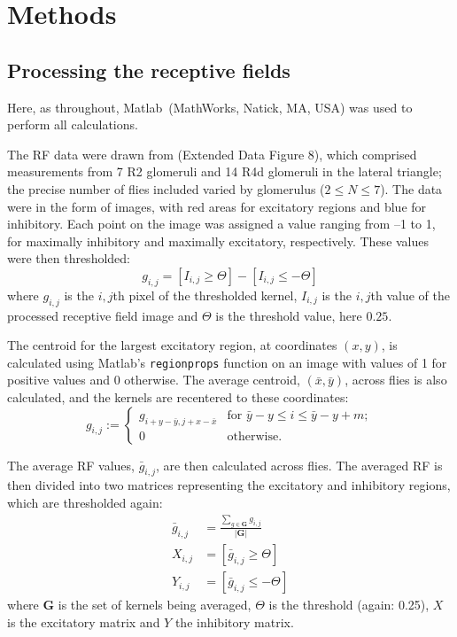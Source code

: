 

\section{Methods}
\subsection{Processing the receptive fields}
\label{sec:methods:preprocessing}

Here, as throughout, Matlab\textregistered\ (MathWorks, Natick, MA, USA) was used to perform all calculations.

The \ac{RF} data were drawn from  (Extended Data Figure 8), which comprised measurements from 7 R2 glomeruli and 14 R4d glomeruli in the lateral triangle; the precise number of flies included varied by glomerulus ($2\le N\le 7$).
The data were in the form of images, with red areas for excitatory regions and blue for inhibitory.
Each point on the image was assigned a value ranging from --1 to 1, for maximally inhibitory and maximally excitatory, respectively.
These values were then thresholded:
$$
g_{i,j} = [I_{i,j} \ge \Theta] - [I_{i,j} \le -\Theta]
$$
where $g_{i,j}$ is the $i,j$th pixel of the thresholded kernel, $I_{i,j}$ is the $i,j$th value of the processed receptive field image and $\Theta$ is the threshold value, here $0.25$.

The centroid for the largest excitatory region, at coordinates $(x,y)$, is calculated using Matlab's \texttt{regionprops} function on an image with values of 1 for positive values and 0 otherwise.
The average centroid, $(\bar{x},\bar{y})$, across flies is also calculated, and the kernels are recentered to these coordinates:
$$
g_{i,j} := \left\{ \begin{array}{ll} g_{i+y-\bar{y},j+x-\bar{x}} & \mbox{for } \bar{y}-y \le i \le \bar{y}-y+m ;\\
0 & \mbox{otherwise.} \end{array} \right.
$$

The average \ac{RF} values, $\bar{g}_{i,j}$, are then calculated across flies.
The averaged \ac{RF} is then divided into two matrices representing the excitatory and inhibitory regions, which are thresholded again:
\begin{align*}
\bar{g}_{i,j} &= \frac{\sum\limits_{g \in \bm{G}} g_{i,j}}{|\bm{G}|} \\
X_{i,j} &= [\bar{g}_{i,j} \ge \Theta] \\
Y_{i,j} &= [\bar{g}_{i,j} \le -\Theta]
\end{align*}
where $\bm{G}$ is the set of kernels being averaged, $\Theta$ is the threshold (again: 0.25), $X$ is the excitatory matrix and $Y$ the inhibitory matrix.

